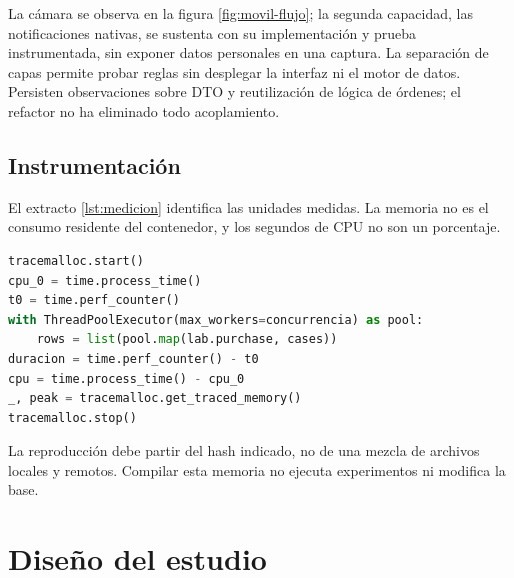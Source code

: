 \documentclass[12pt,a4paper]{article}
\newcommand{\seccion}[1]{\section{#1}}
\begin{document}
La cámara se observa en la figura \ref{fig:movil-flujo}; la segunda capacidad, las notificaciones nativas, se sustenta con su implementación y prueba instrumentada, sin exponer datos personales en una captura. La separación de capas permite probar reglas sin desplegar la interfaz ni el motor de datos. Persisten observaciones sobre DTO y reutilización de lógica de órdenes; el refactor no ha eliminado todo acoplamiento.

\subsection{Instrumentación}
El extracto \ref{lst:medicion} identifica las unidades medidas. La memoria no es el consumo residente del contenedor, y los segundos de CPU no son un porcentaje.

\begin{minipage}{\linewidth}
\begin{lstlisting}[language=Python,caption={Instrumentación del ejecutor del Paso 8.},label={lst:medicion}]
tracemalloc.start()
cpu_0 = time.process_time()
t0 = time.perf_counter()
with ThreadPoolExecutor(max_workers=concurrencia) as pool:
    rows = list(pool.map(lab.purchase, cases))
duracion = time.perf_counter() - t0
cpu = time.process_time() - cpu_0
_, peak = tracemalloc.get_traced_memory()
tracemalloc.stop()
\end{lstlisting}
\end{minipage}
La reproducción debe partir del hash indicado, no de una mezcla de archivos locales y remotos. Compilar esta memoria no ejecuta experimentos ni modifica la base.



\seccion{Diseño del estudio}
\end{document}
